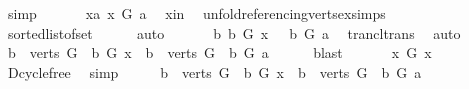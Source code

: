 \begin{isabellebody}
\ simp\ \isanewline
\ \ \isamarkupfalse%
\ \isamarkupfalse%
\ xa{\isacharcolon}{\kern0pt}\ {\isachardoublequoteopen}x\ {\isasymrightarrow}\isactrlsup {\isacharplus}{\kern0pt}\isactrlbsub G\isactrlesub \ a{\isachardoublequoteclose}\ \isamarkupfalse%
\ x{\isacharunderscore}{\kern0pt}in\ \isamarkupfalse%
\ unfold{\isacharunderscore}{\kern0pt}referencing{\isacharunderscore}{\kern0pt}verts{\isacharunderscore}{\kern0pt}ex{\isachardot}{\kern0pt}simps\ \isanewline
\ \ \ \ \isamarkupfalse%
\ sorted{\isacharunderscore}{\kern0pt}list{\isacharunderscore}{\kern0pt}of{\isacharunderscore}{\kern0pt}set{\isacharparenleft}{\kern0pt}{}{\isacharparenright}{\kern0pt}\isanewline
\ \ \ \ \isamarkupfalse%
\ auto\ \isanewline
\ \ \isamarkupfalse%
\ \isamarkupfalse%
\ {\isachardoublequoteopen}{\isasymAnd}b{\isachardot}{\kern0pt}\ b\ {\isasymrightarrow}\isactrlsup {\isacharplus}{\kern0pt}\isactrlbsub G\isactrlesub \ x\ {\isasymLongrightarrow}\ \ b\ {\isasymrightarrow}\isactrlsup {\isacharplus}{\kern0pt}\isactrlbsub G\isactrlesub \ a{\isachardoublequoteclose}\ \isamarkupfalse%
\ trancl{\isacharunderscore}{\kern0pt}trans\ \isamarkupfalse%
\ auto\isanewline
\ \ \isamarkupfalse%
\ \isamarkupfalse%
\ {\isachardoublequoteopen}{\isacharbraceleft}{\kern0pt}b\ {\isasymin}\ verts\ G{\isachardot}{\kern0pt}\ \ b\ {\isasymrightarrow}\isactrlsup {\isacharplus}{\kern0pt}\isactrlbsub G\isactrlesub \ x{\isacharbraceright}{\kern0pt}\ {\isasymsubseteq}\ {\isacharbraceleft}{\kern0pt}b\ {\isasymin}\ verts\ G{\isachardot}{\kern0pt}\ \ b\ {\isasymrightarrow}\isactrlsup {\isacharplus}{\kern0pt}\isactrlbsub G\isactrlesub \ a{\isacharbraceright}{\kern0pt}{\isachardoublequoteclose}\isanewline
\ \ \ \ \isamarkupfalse%
\ blast\isanewline
\ \ \isamarkupfalse%
\ \isamarkupfalse%
\ {\isachardoublequoteopen}{\isasymnot}\ x\ {\isasymrightarrow}\isactrlsup {\isacharplus}{\kern0pt}\isactrlbsub G\isactrlesub \ x{\isachardoublequoteclose}\ \isamarkupfalse%
\ D{\isachardot}{\kern0pt}cycle{\isacharunderscore}{\kern0pt}free\ \isamarkupfalse%
\ simp\isanewline
\ \ \isamarkupfalse%
\ \isamarkupfalse%
\ {\isachardoublequoteopen}{\isacharbraceleft}{\kern0pt}b\ {\isasymin}\ verts\ G{\isachardot}{\kern0pt}\ \ b\ {\isasymrightarrow}\isactrlsup {\isacharplus}{\kern0pt}\isactrlbsub G\isactrlesub \ x{\isacharbraceright}{\kern0pt}\ {\isasymsubset}\ {\isacharbraceleft}{\kern0pt}b\ {\isasymin}\ verts\ G{\isachardot}{\kern0pt}\ \ b\ {\isasymrightarrow}\isactrlsup {\isacharplus}{\kern0pt}\isactrlbsub G\isactrlesub \ a{\isacharbraceright}{\kern0pt}{\isachardoublequoteclose}\ \isanewline

\end{isabellebody}

